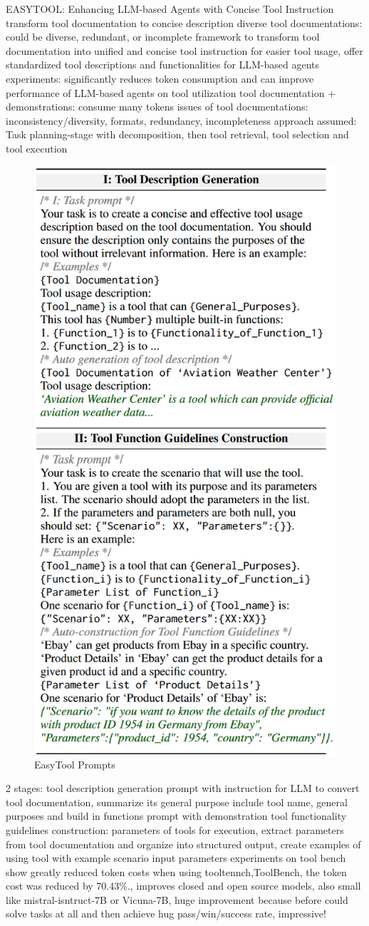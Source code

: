 \documentclass{article}
\begin{document}
\cite{yuan_easytool_2024} EASYTOOL: Enhancing LLM-based Agents with Concise Tool Instruction
transform tool documentation to concise description
diverse tool documentations: could be diverse, redundant, or incomplete
framework to transform tool documentation into unified and concise tool instruction for easier tool usage, offer standardized tool descriptions and functionalities for LLM-based agents
experiments: significantly reduces token consumption and can improve performance of LLM-based agents on tool utilization
tool documentation + demonstrations: consume many tokens
issues of tool documentations: inconsistency/diversity, formats, redundancy, incompleteness
approach assumed: Task planning-stage with decomposition, then tool retrieval, tool selection and tool execution
\begin{figure}[h]
	\centering
	\includegraphics[width=0.55\linewidth]{EasyToolPrompts.png}
	\caption{EasyTool Prompts \cite{yuan_easytool_2024}}
	\label{fig:easytoolprompts}
\end{figure}
2 stages:
tool description generation
prompt with instruction for LLM to convert tool documentation, summarize its general purpose
include tool name, general purposes and build in functions
prompt with demonstration
tool functionality guidelines construction:
parameters of tools for execution, extract parameters from tool documentation and organize into structured output, create examples of using tool with example scenario input parameters
experiments on tool bench show greatly reduced token costs when using tooltennch,ToolBench, the token cost was reduced by 70.43\%., improves closed and open source models, also small like mistral-isntruct-7B or Vicuna-7B, huge improvement because before could solve tasks at all and then achieve hug pass/win/success rate, impressive!
\end{document}
